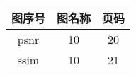
\newpage\thispagestyle{empty}
\begin{center}{\bfseries\xiaoer{}}\end{center}
\vspace{-2em}
\begin{center}\setcounter{page}{1}\end{center}


 {\wuhao
   \begin{raggedright}
    \begin{tabular}{|c| c| c|}
	     	\hline
	       \hspace{4em}图序号 \hspace{4em} & \hspace{7em}图名称 \hspace{7em} &\hspace{4em} 页码 \hspace{4em} \\
	      \hline
	       psnr  &  10     &  20   \\
	       \hline
	       ssim  &  10     &   21    \\
	       \hline   	
     \end{tabular}
 \end{raggedright} 
 }   

 



\newpage\thispagestyle{empty}
\begin{center}{\bfseries\xiaoer{}}\end{center}

